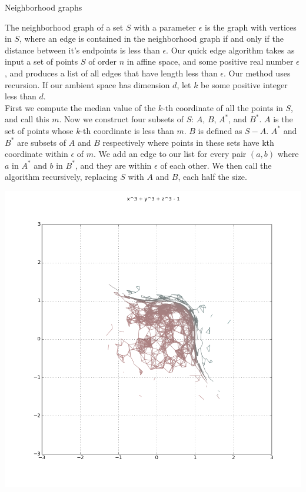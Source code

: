 \documentclass{beamer}
\begin{document}
\begin{frame}{}
\begin{columns}[t]
\begin{column}{0.32\linewidth}
\begin{block}{Neighborhood graphs}

The neighborhood graph of a set $S$ with a parameter $\epsilon$ is the graph
with vertices in $S$, where an edge is contained in the neighborhood graph if
and only if the distance between it's endpoints is less than $\epsilon$. Our
quick edge algorithm takes as input a set of points $S$ of order $n$ in affine
space, and some positive real number $\epsilon$, and produces a list of all edges that have length less than $\epsilon$. Our method uses recursion. If our ambient space has dimension $d$, let $k$ be some positive integer less than $d$. 
\\

First we compute the median value of the $k$-th coordinate of all the points in $S$, and call this $m$. Now we construct four subsets of $S$: $A$, $B$, $A^*$, and $B^*$. $A$ is the set of points whose $k$-th coordinate is less than $m$. $B$ is defined as $S-A$. $A^*$ and $B^*$ are subsets of $A$ and $B$ respectively where points in these sets have kth coordinate within $\epsilon$ of $m$. We add an edge to our list for every pair $(a,b)$ where $a$ in $A^*$ and $b$ in $B^*$, and they are within $\epsilon$ of each other. We then call the algorithm recursively, replacing $S$ with $A$ and $B$, each half the size.

\includegraphics[width=1\columnwidth]{plot2d_ng_7}
\end{block}


\end{column}
\end{columns}
\end{frame}
\end{document}
